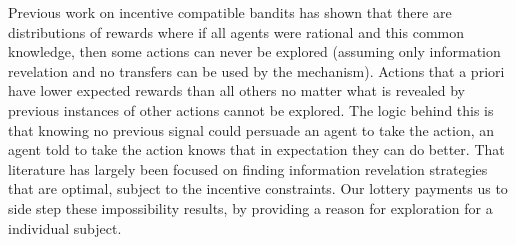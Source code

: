 Previous work on incentive compatible bandits \cite{kremer2014implementing,mansour2015bayesian} has shown that there are distributions of rewards where if all agents were rational and this common knowledge, then some actions can never be explored (assuming only information revelation and no transfers can be used by the mechanism). 
Actions that a priori have lower expected rewards than all others no matter what is revealed by previous instances of other actions cannot be explored.
The logic behind this is that knowing no previous signal could persuade an agent to take the action, an agent told to take the action knows that in expectation they can do better.
That literature has largely been focused on finding information revelation strategies that are optimal, subject to the incentive constraints. 
Our lottery payments us to side step these impossibility results, by providing a reason for exploration for a individual subject. 





